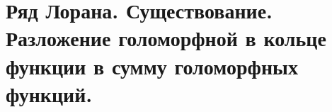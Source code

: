 \section{Ряд Лорана. Существование. Разложение голоморфной в кольце функции в сумму голоморфных функций.}\newpage

\newpage

